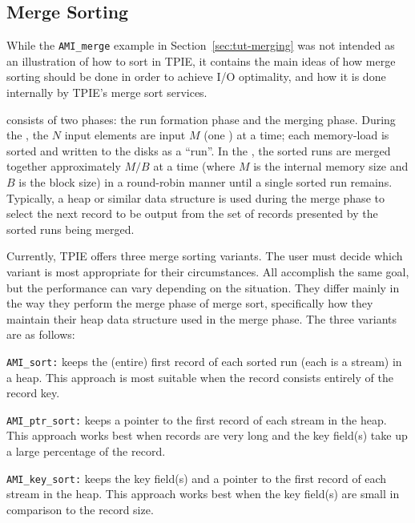 \subsection{Merge Sorting} 
 While the \lstinline|AMI_merge| example in
Section~\ref{sec:tut-merging} was not intended as an illustration of
how to sort in TPIE, it contains the main ideas of how merge sorting
should be done in order to achieve I/O optimality, and how it is done
internally by TPIE's merge sort services.

\noindent
{} consists of two phases: the run formation phase and
the merging phase.  During the , the $N$
input elements are input $M$ (one ) at a time; each
memory-load is sorted and written to the disks as a ``run''.  In the
, the sorted runs are merged together approximately
$M/B$ at a time (where $M$ is the internal memory size and $B$ is the
block size) in a round-robin manner until a single sorted run remains.
Typically, a heap or similar data structure is used during the merge
phase to select the next record to be output from the set of records
presented by the sorted runs being merged.

Currently, TPIE offers three merge sorting variants. The user must
decide which variant is most appropriate for their circumstances.  All
accomplish the same goal, but the performance can vary depending on
the situation. They differ mainly in the way they perform the merge
phase of merge sort, specifically how they maintain their heap data
structure used in the merge phase. The three variants are as follows:

\begin{description}
\item\lstinline|AMI_sort:| keeps the (entire) first record of each
  sorted run (each is a stream) in a heap. This approach is most
  suitable when the record consists entirely of the record key.
  
\item\lstinline|AMI_ptr_sort:| keeps a pointer to the first record of
  each stream in the heap. This approach works best when records are
  very long and the key field(s) take up a large percentage of the
  record.
  
\item\lstinline|AMI_key_sort:| keeps the key field(s) and a pointer to
  the first record of each stream in the heap. This approach works
  best when the key field(s) are small in comparison to the record
  size.
\end{description}

